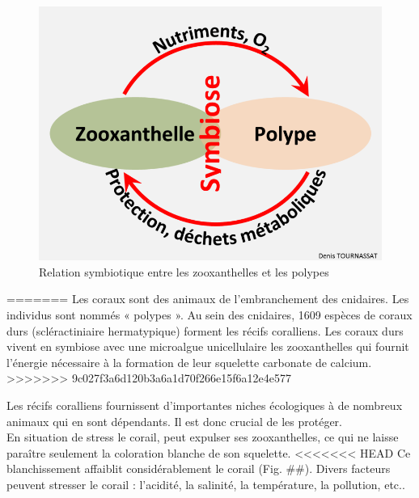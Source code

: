 \documentclass[]{report}
\begin{document}
\begin{figure}
\centering
\includegraphics{../image/symbiose.png}
\caption{Relation symbiotique entre les zooxanthelles et les polypes}
\end{figure}
=======
Les coraux sont des animaux de l'embranchement des cnidaires. Les
individus sont nommés « polypes ». Au sein des cnidaires, 1609 espèces
de coraux durs (scléractiniaire hermatypique) forment les récifs
coralliens. Les coraux durs vivent en symbiose avec une microalgue
unicellulaire les zooxanthelles qui fournit l'énergie nécessaire à la
formation de leur squelette carbonate de calcium.
>>>>>>> 9c027f3a6d120b3a6a1d70f266e15f6a12e4e577

Les récifs coralliens fournissent d'importantes niches écologiques à de
nombreux animaux qui en sont dépendants. Il est donc crucial de les
protéger.\\
En situation de stress le corail, peut expulser ses zooxanthelles, ce
qui ne laisse paraître seulement la coloration blanche de son squelette.
<<<<<<< HEAD
Ce blanchissement affaiblit considérablement le corail (Fig. \#\#).
Divers facteurs peuvent stresser le corail : l'acidité, la salinité, la
température, la pollution, etc..
\end{document}
